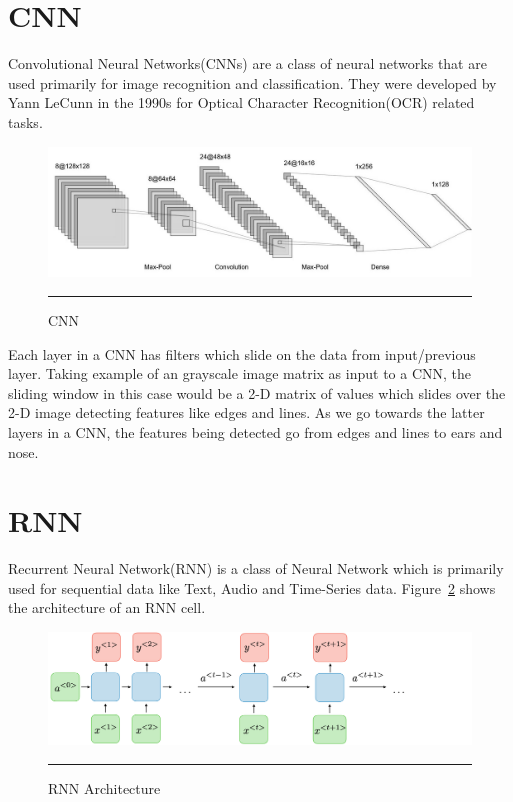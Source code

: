 \section{CNN}

Convolutional Neural Networks(CNNs) are a class of neural networks that are used primarily for image recognition and classification. They were developed by Yann LeCunn in the 1990s for Optical Character Recognition(OCR) related tasks\cite{cnn_726791}.
\begin{figure}[htbp]
  \centering
    \includegraphics[scale=0.5]{Figures/cnn.JPG}
    \rule{35em}{0.5pt}
  \caption[Convolutional Neural Network]{CNN}
  \label{fig:cnn_architecture}
\end{figure}

Each layer in a CNN has filters which slide on the data from input/previous layer. Taking example of an grayscale image matrix as input to a CNN, the sliding window in this case would be a 2-D matrix of values which slides over the 2-D image detecting features like edges and lines. As we go towards the latter layers in a CNN, the features being detected go from edges and lines to ears and nose. 

\section{RNN}

Recurrent Neural Network(RNN) is a class of Neural Network which is primarily used for sequential data like Text, Audio and Time-Series data. Figure~\ref{fig:rnn_architecture} shows the architecture of an RNN cell.\\

\begin{figure}[htbp]
  \centering
    \includegraphics[scale=0.3]{Figures/architecture-rnn-ltr.png}
    \rule{35em}{0.5pt}
  \caption[Recurrent Neural Network]{RNN Architecture}
  \label{fig:rnn_architecture}
\end{figure}

